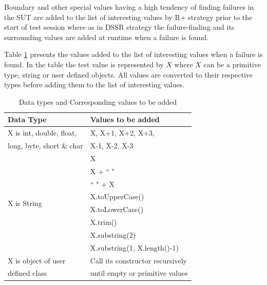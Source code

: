 Boundary and other special values having a high tendency of finding failures in the SUT are added to the list of interesting values by R+ strategy prior to the start of test session where as in DSSR strategy the failure-finding and its surrounding values are added at runtime when a failure is found. 

Table \ref{table:addvalues2} presents the values added to the list of interesting values when a failure is found. In the table the test value is represented by $X$ where $X$ can be a primitive type, string or user defined objects. All values are converted to their respective types before adding them to the list of interesting values.






\begin{table}[ht]
\caption{Data types and Corresponding values to be added} %
\centering %
{\renewcommand{\arraystretch}{1.5} 
\begin{tabular}{| l | l |} %
\hline\hline %
Data Type & Values to be added\\ [0.5ex] %
\hline %
\multirow{1}{*}{X is int, double, float, } & X,  X+1, X+2, X+3,  \\ %
\multirow{1}{*}{long, byte, short \& char} & X-1, X-2, X-3 \\ 

\hline
\multirow{8}{*}{X is String} & X\\ %

& X + ``  "\\ %
& ``  " + X \\ %
& X.toUpperCase() \\
& X.toLowerCase() \\
& X.trim() \\
& X.substring(2) \\
& X.substring(1, X.length()-1) \\
\hline
\multirow{1}{*}{X is object of user} & Call its constructor recursively \\ %
\multirow{1}{*}{defined class} & until empty or primitive values \\[1ex]
\hline
\hline %
\end{tabular}
}
\bigskip
\label{table:addvalues2} %
\end{table}



